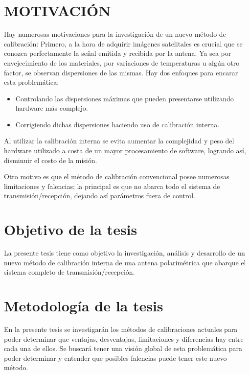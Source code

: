 \documentclass[a4paper,10pt]{article}
\begin{document}
	\section{MOTIVACIÓN}
		Hay numerosas motivaciones para la investigación de un nuevo método de 
	calibración:
		Primero, a la hora de adquirir imágenes satelitales es crucial que se 
	conozca perfectamente la señal emitida y recibida por la antena. Ya sea por 
	envejecimiento de los materiales, por variaciones de temperaturas u algún 
	otro factor, se observan dispersiones de las mismas. Hay dos enfoques para 
	encarar esta problemática:

		\begin{itemize}
			\item Controlando las dispersiones máximas que pueden presentarse 
			utilizando hardware más complejo.

			\item Corrigiendo dichas dispersiones haciendo uso de calibración 
			interna.
		\end{itemize}

		Al utilizar la calibración interna se evita aumentar la complejidad y 
	peso del hardware utilizado a costa de un mayor procesamiento de software, 
	logrando así, disminuir el costo de la misión.
		
		Otro motivo es que el método de calibración convencional posee numerosas
	limitaciones y falencias; la principal es que no abarca todo el sistema de 
	transmisión/recepción, dejando así parámetros fuera de control. 


		
	\section{Objetivo de la tesis}
		La presente tesis tiene como objetivo la investigación, análisis y 
	desarrollo de un nuevo método de calibración interna de una antena 
	polarimétrica que abarque el sistema completo de transmisión/recepción. 

	\section{Metodología de la tesis}
		En la presente tesis se investigarán los métodos de calibraciones 
	actuales para poder determinar que ventajas, desventajas, limitaciones y 
	diferencias hay entre cada una de ellos. Se buscará tener una visión global
	de esta problemática para poder determinar y entender que posibles falencias
	puede tener este nuevo método.
\end{document}
